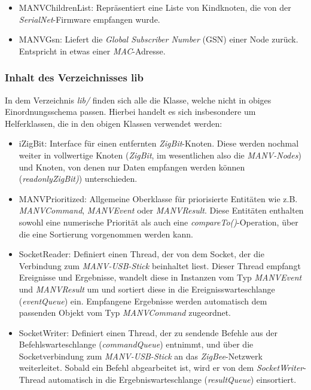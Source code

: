     \begin{itemize}
        \item{MANVChildrenList:} Repräsentiert eine Liste von Kindknoten, die von der \emph{SerialNet}-Firmware empfangen wurde.
        \item{MANVGsn:} Liefert die \emph{Global Subscriber Number} (GSN) einer Node zurück. Entspricht in etwas einer \emph{MAC}-Adresse.
    \end{itemize}

    \subsubsection{Inhalt des Verzeichnisses lib}

    In dem Verzeichnis \emph{lib/} finden sich alle die Klasse, welche nicht in obiges Einordnungsschema passen. Hierbei handelt
    es sich insbesondere um Helferklassen, die in den obigen Klassen verwendet werden:

    \begin{itemize}
        \item{iZigBit:} Interface für einen entfernten \emph{ZigBit}-Knoten. Diese werden nochmal weiter
                        in vollwertige Knoten (\emph{ZigBit}, im wesentlichen also die \emph{MANV-Nodes})
                        und Knoten, von denen nur Daten empfangen werden können (\emph{readonlyZigBit)})
                        unterschieden.
        \item{MANVPrioritized:} Allgemeine Oberklasse für priorisierte Entitäten wie z.B. \emph{MANVCommand},
                                \emph{MANVEvent} oder \emph{MANVResult}. Diese Entitäten enthalten 
                                sowohl eine numerische Priorität als auch eine \emph{compareTo()}-Operation,
                                über die eine Sortierung vorgenommen werden kann.
        \item{SocketReader:} Definiert einen Thread, der von dem Socket, der die Verbindung zum \emph{MANV-USB-Stick}
                             beinhaltet liest. Dieser Thread empfangt Ereignisse und Ergebnisse, wandelt diese 
                             in Instanzen vom Typ \emph{MANVEvent} und \emph{MANVResult} um und sortiert diese
                             in die Ereignisswarteschlange (\emph{eventQueue}) ein. Empfangene Ergebnisse werden
                             automatisch dem passenden Objekt vom Typ \emph{MANVCommand} zugeordnet.
        \item{SocketWriter:} Definiert einen Thread, der zu sendende Befehle aus der Befehlswarteschlange
                             (\emph{commandQueue}) entnimmt, und über die Socketverbindung zum \emph{MANV-USB-Stick}
                             an das \emph{ZigBee}-Netzwerk weiterleitet. Sobald ein Befehl abgearbeitet ist,
                             wird er von dem \emph{SocketWriter}-Thread automatisch in die Ergebniswarteschlange 
                             (\emph{resultQueue}) einsortiert.
    \end{itemize}


